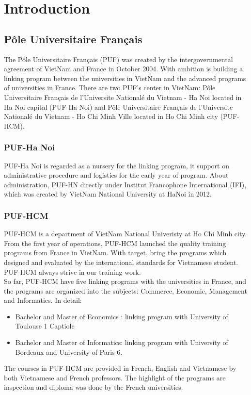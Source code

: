 \chapter{Introduction}
\section{P\^{o}le Universitaire Fran\c{c}ais}
The P\^{o}le Universitaire Fran\c{c}ais (PUF) was created by the intergovernmental agreement of VietNam and France in October 2004. With ambition is building a linking program between the universities in VietNam and the advanced programs of universities in France. There are two PUF's center in VietNam: P\^{o}le Universitaire Fran\c{c}ais de l'Universite National\'{e} du Vietnam - Ha Noi located in Ha Noi capital (PUF-Ha Noi) and P\^{o}le Universitaire Fran\c{c}ais de l'Universite National\'{e} du Vietnam - Ho Chi Minh Ville located in Ho Chi Minh city (PUF-HCM).
\subsection{PUF-Ha Noi}
PUF-Ha Noi is regarded as a nursery for the linking program, it support on administrative procedure and logistics for the early year of program. About administration, PUF-HN directly under Institut Francophone International (IFI), which was created by VietNam National University at HaNoi in 2012.
\subsection{PUF-HCM}
PUF-HCM is a department of VietNam National Univeristy at Ho Chi Minh city. From the first year of operations, PUF-HCM launched the quality training programs from France in VietNam. With target, bring the programs which designed and evaluated by the international standards for Vietnamese student. PUF-HCM always strive in our training work.\\
So far, PUF-HCM have five linking programs with the universities in France, and the programs are organized into the subjects: Commerce, Economic, Management and Informatics. In detail:
\begin{itemize}
\item Bachelor and Master of Economics : linking program with University of Toulouse 1 Captiole
\item Bachelor and Master of Informatics: linking program with University of Bordeaux and University of Paris 6.
\end{itemize}
The courses in PUF-HCM are provided in French, English and Vietnamese by both Vietnamese and French professors. The highlight of the programs are inspection and diploma was done by the French universities.
